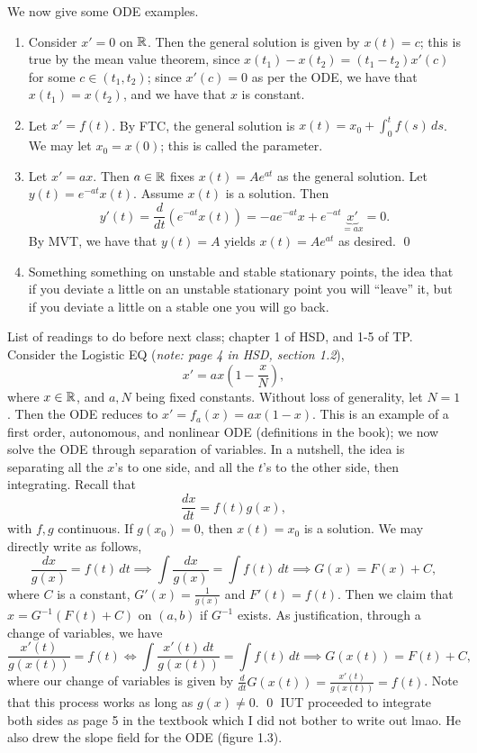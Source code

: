 \medskip\newline
We now give some ODE examples.
\begin{enumerate}[label=(\roman*)]
    \item Consider $x' = 0$ on $\mathbb R$. Then the general solution is given by $x(t) = c$; this is true by the mean value theorem, since $x(t_1) - x(t_2) = (t_1 - t_2) x'(c)$ for some $c \in (t_1, t_2)$; since $x'(c) = 0$ as per the ODE, we have that $x(t_1) = x(t_2)$, and we have that $x$ is constant.
    \item Let $x' = f(t)$. By FTC, the general solution is $x(t) = x_0 + \int_0^t f(s) \, ds$. We may let $x_0 = x(0)$; this is called the parameter.
    \item Let $x' = ax$. Then $a \in \mathbb R$ fixes $x(t) = Ae^{at}$ as the general solution. Let $y(t) = e^{-at} x(t)$. Assume $x(t)$ is a solution. Then
    \[ y'(t) = \frac{d}{dt} (e^{-at} x(t)) = -a e^{-at} x + e^{-at} \underbrace{x'}_{=ax} = 0. \]
    By MVT, we have that $y(t) = A$ yields $x(t) = Ae^{at}$ as desired. \qed
    \item Something something on unstable and stable stationary points, the idea that if you deviate a little on an unstable stationary point you will ``leave'' it, but if you deviate a little on a stable one you will go back.
\end{enumerate}
List of readings to do before next class; chapter 1 of HSD, and 1-5 of TP.
\medskip\newline
Consider the Logistic EQ (\textit{note: page 4 in HSD, section 1.2}),
\[ x' = a x\left(1 - \frac{x}{N}\right), \]
where $x \in \mathbb R$, and $a, N$ being fixed constants. Without loss of generality, let $N = 1$. Then the ODE reduces to $x' = f_a(x) = ax(1 - x)$. This is an example of a first order, autonomous, and nonlinear ODE (definitions in the book); we now solve the ODE through separation of variables.
\medskip\newline
In a nutshell, the idea is separating all the $x$'s to one side, and all the $t$'s to the other side, then integrating. Recall that
\[ \frac{dx}{dt} = f(t) g(x), \]
with $f, g$ continuous. If $g(x_0) = 0$, then $x(t) = x_0$ is a solution. We may directly write as follows,
\[ \frac{dx}{g(x)} = f(t) \, dt \implies \int \frac{dx}{g(x)} = \int f(t) \, dt \implies G(x) = F(x) + C, \]
where $C$ is a constant, $G'(x) = \frac{1}{g(x)}$ and $F'(t) = f(t)$. Then we claim that $x = G^{-1}(F(t) + C)$ on $(a, b)$ if $G^{-1}$ exists. As justification, through a change of variables, we have
\[ \frac{x'(t)}{g(x(t))} = f(t) \iff \int \frac{x'(t) \, dt}{g(x(t))} = \int f(t) \, dt \implies G(x(t)) = F(t) + C, \]
where our change of variables is given by $\frac{d}{dt} G(x(t)) = \frac{x'(t)}{g(x(t))} = f(t)$. Note that this process works as long as $g(x) \neq 0$. \qed
\medskip\newline
IUT proceeded to integrate both sides as page 5 in the textbook which I did not bother to write out lmao. He also drew the slope field for the ODE (figure 1.3).